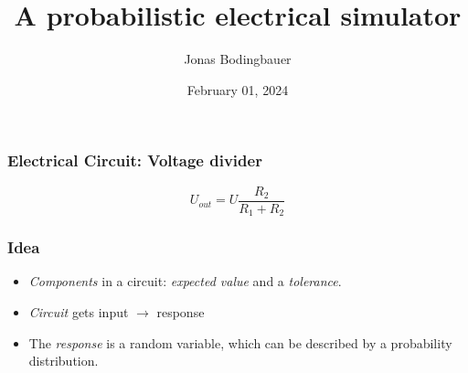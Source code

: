 \documentclass{beamer}
\title{A probabilistic electrical simulator}
\date{February 01, 2024}
\author{Jonas Bodingbauer}
\institute{}
\begin{document}
  \maketitle

  \begin{frame}
    \frametitle{Electrical Circuit: Voltage divider}
    \begin{figure}
      \centering
    \end{figure}

    \[U_{out} = U \frac{R_2}{R_1 + R_2}\]
  \end{frame}

  \begin{frame}
    \frametitle{Idea}
    \begin{itemize}[<+->]
      \item \emph{Components} in a circuit: \emph{expected value} and a \emph{tolerance}.  \\ 
      \item \emph{Circuit} gets input $\rightarrow$ response 
      \item The \emph{response} is a random variable, which can be described by a probability distribution. 
    \end{itemize}
  \end{frame}
\end{document}
